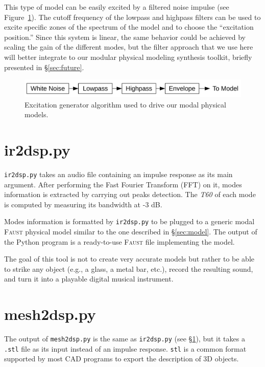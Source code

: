 \documentclass[11pt,a4paper]{article}
\newcommand{\f}{\textsc{Faust}}
\begin{document}
This type of model can be easily excited by a filtered noise impulse (see Figure~\ref{fig:excitation}). The cutoff frequency of the lowpass and highpass filters can be used to excite specific zones of the spectrum of the model and to choose the ``excitation position.'' Since this system is linear, the same behavior could be achieved by scaling the gain of the different modes, but the filter approach that we use here will better integrate to our modular physical modeling synthesis toolkit, briefly presented in \S{}\ref{sec:future}. 

\begin{figure}[htbp]
 	\centering \includegraphics[width=\columnwidth]{pictures/excitation}
	\caption{Excitation generator algorithm used to drive our modal physical models.}
	\label{fig:excitation}
\end{figure}

\section{ir2dsp.py}
\label{sec:irdsp}

\texttt{ir2dsp.py} takes an audio file containing an impulse response as its main argument. After performing the Fast Fourier Transform (FFT) on it, modes information is extracted by carrying out peaks detection. The \textit{T60} of each mode is computed by measuring its bandwidth at -3 dB.

Modes information is formatted by \texttt{ir2dsp.py} to be plugged to a generic modal \f{} physical model similar to the one described in \S{}\ref{sec:model}. The output of the Python program is a ready-to-use \f{} file implementing the model. 

The goal of this tool is not to create very accurate models but rather to be able to strike any object (e.g., a glass, a metal bar, etc.), record the resulting sound, and turn it into a playable digital musical instrument.

\section{mesh2dsp.py}

The output of \texttt{mesh2dsp.py} is the same as \texttt{ir2dsp.py} (see \S{}\ref{sec:irdsp}), but it takes a \texttt{.stl} file as its input instead of an impulse response. \texttt{stl} is a common format supported by most CAD programs to export the description of 3D objects.
\end{document}
